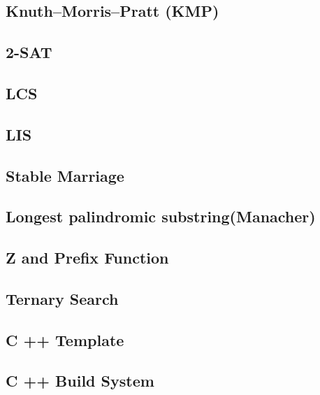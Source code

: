 \documentclass[10pt]{extarticle}
\begin{document}
\begin{multicols*}{2}
\subsection{Knuth--Morris--Pratt (KMP)} %


\subsection{2-SAT} %


\subsection{LCS} %


\subsection{LIS} %


\subsection{Stable Marriage} %



\subsection{Longest palindromic substring(Manacher)} %


\subsection{Z and Prefix Function} %


\subsection{Ternary Search} %


\subsection{C ++ Template} %


\subsection{C ++ Build System} %



\end{multicols*}
\end{document}
